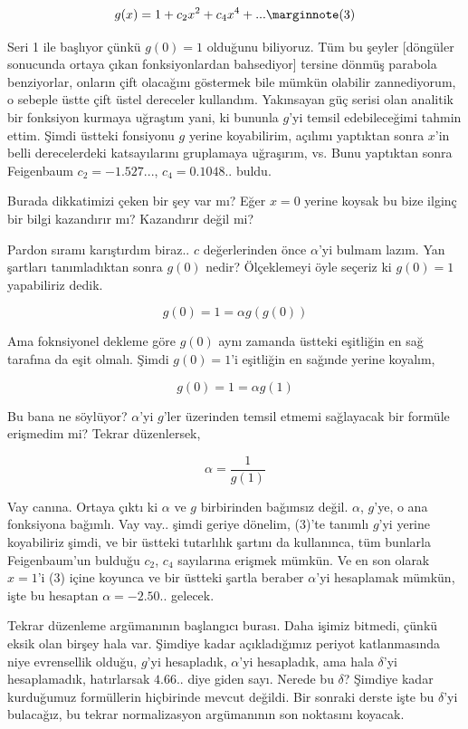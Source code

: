 \documentclass[12pt,fleqn]{article}\usepackage{../../common}
\begin{document}
$$
g(x) = 1 + c_2 x^2 + c_4 x^4 + ... 
\mlabel{3}
$$

Seri 1 ile başlıyor çünkü $g(0)=1$ olduğunu biliyoruz. Tüm bu şeyler [döngüler
  sonucunda ortaya çıkan fonksiyonlardan bahsediyor] tersine dönmüş parabola
benziyorlar, onların çift olacağını göstermek bile mümkün olabilir zannediyorum,
o sebeple üstte çift üstel dereceler kullandım. Yakınsayan güç serisi olan
analitik bir fonksiyon kurmaya uğraştım yani, ki bununla $g$'yi temsil
edebileceğimi tahmin ettim. Şimdi üstteki fonsiyonu $g$ yerine koyabilirim,
açılımı yaptıktan sonra $x$'in belli derecelerdeki katsayılarını gruplamaya
uğraşırım, vs. Bunu yaptıktan sonra Feigenbaum $c_2 = -1.527...$, $c_4 =
0.1048..$ buldu.

Burada dikkatimizi çeken bir şey var mı? Eğer $x=0$ yerine koysak bu bize ilginç
bir bilgi kazandırır mı? Kazandırır değil mi?

Pardon sıramı karıştırdım biraz.. $c$ değerlerinden önce $\alpha$'yi bulmam
lazım. Yan şartları tanımladıktan sonra $g(0)$ nedir? Ölçeklemeyi öyle seçeriz
ki $g(0)=1$ yapabiliriz dedik. 

$$ g(0) = 1 = \alpha g(g(0))$$

Ama foknsiyonel dekleme göre $g(0)$ aynı zamanda üstteki eşitliğin en sağ
tarafına da eşit olmalı. Şimdi $g(0)=1$'i eşitliğin en sağınde yerine koyalım,

$$ g(0) = 1 = \alpha g(1)$$

Bu bana ne söylüyor? $\alpha$'yi $g$'ler üzerinden temsil etmemi sağlayacak bir
formüle erişmedim mi? Tekrar düzenlersek,

$$ \alpha = \frac{1}{g(1)}$$

Vay canına. Ortaya çıktı ki $\alpha$ ve $g$ birbirinden bağımsız
değil. $\alpha$, $g$'ye, o ana fonksiyona bağımlı. Vay vay.. şimdi geriye
dönelim, (3)'te tanımlı $g$'yi yerine koyabiliriz şimdi, ve bir üstteki
tutarlılık şartını da kullanınca, tüm bunlarla Feigenbaum'un bulduğu $c_2$,
$c_4$ sayılarına erişmek mümkün. Ve en son olarak $x=1$'i (3) içine koyunca ve
bir üstteki şartla beraber $\alpha$'yi hesaplamak mümkün, işte bu hesaptan
$\alpha = -2.50..$ gelecek. 

Tekrar düzenleme argümanının başlangıcı burası. Daha işimiz bitmedi, çünkü eksik
olan birşey hala var. Şimdiye kadar açıkladığımız periyot katlanmasında niye
evrensellik olduğu, $g$'yi hesapladık, $\alpha$'yi hesapladık, ama hala
$\delta$'yi hesaplamadık, hatırlarsak $4.66..$ diye giden sayı. Nerede bu
$\delta$? Şimdiye kadar kurduğumuz formüllerin hiçbirinde mevcut değildi. Bir
sonraki derste işte bu $\delta$'yi bulacağız, bu tekrar normalizasyon
argümanının son noktasını koyacak.
\end{document}
